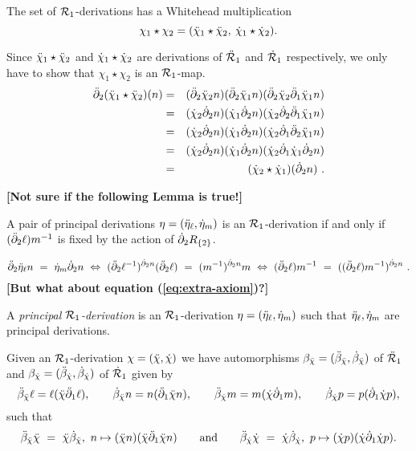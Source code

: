 \begin{lem}
The set of $\mathcal{R}_1$-derivations has a Whitehead multiplication 
$$ 
\chi_1 \star  \chi_2 = (\ddot{\chi}_1 \star  \ddot{\chi}_2, \: \dot{\chi}_1 \star  \dot{\chi}_2).
$$
\end{lem}
\begin{pf}
Since $\ddot{\chi}_1 \star \ddot{\chi}_2$ and $\dot{\chi}_1 \star \dot{\chi}_2$ are derivations of 
$\ddot{\mathcal{R}}_1$ and $\dot{\mathcal{R}}_1$ respectively, 
we only have to show that $\chi_1 \star \chi_2$ is an $\mathcal{R}_1$-map.
\begin{eqnarray*}
\ddot{\partial}_2 (\ddot{\chi}_1 \star \ddot{\chi}_2)(n)  
  & = & (\ddot{\partial}_2 \ddot{\chi}_2 n) (\ddot{\partial}_2 \ddot{\chi}_1 n) 
         (\ddot{\partial}_2 \ddot{\chi}_2 \ddot{\partial}_1 \ddot{\chi}_1 n) \\
  & = & (\dot{\chi}_2 \dot{\partial}_2 n) (\dot{\chi}_1 \dot{\partial}_2 n) 
         (\dot{\chi}_2 \dot{\partial}_2 \ddot{\partial}_1 \ddot{\chi}_1 n) \\
  & = & (\dot{\chi}_2 \dot{\partial}_2 n) (\dot{\chi}_1 \dot{\partial}_2 n) 
         (\dot{\chi}_2 \dot{\partial}_1 \ddot{\partial}_2 \ddot{\chi}_1 n) \\
  & = & (\dot{\chi}_2 \dot{\partial}_2 n) (\dot{\chi}_1 \dot{\partial}_2 n) 
         (\dot{\chi}_2 \dot{\partial}_1 \dot{\chi}_1 \dot{\partial}_2 n) \\
  & = & (\dot{\chi}_2 \star \dot{\chi}_1)(\dot{\partial}_2 n)~.
\end{eqnarray*}
\end{pf}

\bigskip\noindent
{\bf [Not sure if the following Lemma is true!]}
\vspace{3mm}

\begin{lem}
A pair of principal derivations $\eta = ( \ddot{\eta}_{\ell}, \dot{\eta}_m)$ 
is an $\mathcal{R}_1$-derivation if and only if 
$(\ddot{\partial}_2\ell)m^{-1}$  is fixed by the action of  $\dot{\partial}_2 R_{\{2\}}$.
\end{lem}
\begin{pf}
$$
\ddot{\partial}_2 \ddot{\eta}_{\ell} n ~=~ \dot{\eta}_{m} \dot{\partial}_2 n
~\Leftrightarrow~
(\ddot{\partial}_2 \ell^{-1})^{\dot{\partial}_2 n} (\ddot{\partial}_2 \ell) ~=~ (m^{-1})^{\dot{\partial}_2 n} m 
~\Leftrightarrow~
(\ddot{\partial}_2\ell)m^{-1} ~=~ ((\ddot{\partial}_2\ell)m^{-1})^{\dot{\partial}_2 n}~.
$$
{\bf [But what about equation (\ref{eq:extra-axiom})?]}
\end{pf}

\bigskip
\begin{defn}  
A \emph{principal $\mathcal{R}_1$-derivation} is an $\mathcal{R}_1$-derivation 
$\eta = ( \ddot{\eta}_{\ell}, \dot{\eta}_m)$ such that $\ddot{\eta}_{\ell}, \dot{\eta}_m$ 
are principal derivations.
\end{defn}

\medskip
Given an $\mathcal{R}_1$-derivation $\chi = (\ddot{\chi},\dot{\chi})$ 
we have automorphisms
$\beta_{\ddot{\chi}} = (\ddot{\beta}_{\ddot{\chi}},\dot{\beta}_{\ddot{\chi}})$  of  $\ddot{\mathcal{R}}_1$ 
and
$\beta_{\dot{\chi}} = (\ddot{\beta}_{\dot{\chi}},\dot{\beta}_{\dot{\chi}})$  of  $\dot{\mathcal{R}}_1$ 
given by
$$ 
\ddot{\beta}_{\ddot{\chi}} \ell = \ell(\ddot{\chi} \ddot{\partial}_1 \ell), \qquad
    \dot{\beta}_{\ddot{\chi}} n = n(\ddot{\partial}_1 \ddot{\chi} n),  \qquad
    \ddot{\beta}_{\dot{\chi}} m = m(\dot{\chi} \dot{\partial}_1 m),  \qquad
     \dot{\beta}_{\dot{\chi}} p = p(\dot{\partial}_1 \dot{\chi} p), 
$$
such that
$$
\ddot{\beta}_{\ddot{\chi}} \ddot{\chi} ~=~ \ddot{\chi} \dot{\beta}_{\ddot{\chi}},~ 
n \mapsto (\ddot{\chi} n)(\ddot{\chi} \ddot{\partial}_1 \ddot{\chi} n)
\qquad\mbox{and}\qquad
\ddot{\beta}_{\dot{\chi}} \dot{\chi} ~=~ \dot{\chi} \dot{\beta}_{\dot{\chi}},~
p \mapsto (\dot{\chi} p)(\dot{\chi} \dot{\partial}_1 \dot{\chi} p).
$$

